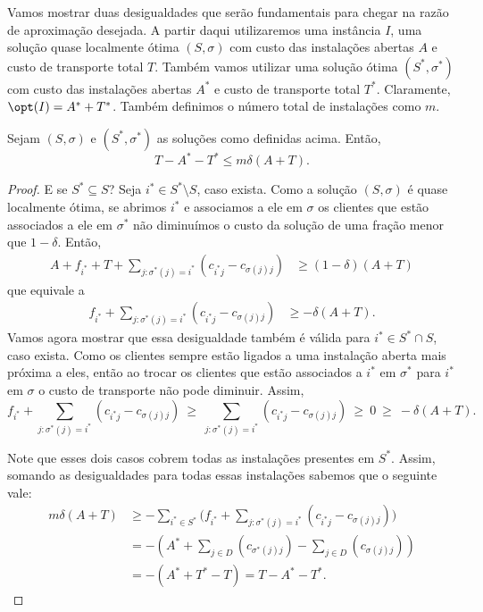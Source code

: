 Vamos mostrar duas desigualdades que serão fundamentais para chegar na razão de aproximação desejada. A partir daqui utilizaremos uma instância $I$, uma solução quase localmente ótima $(S,\sigma)$ com custo das instalações abertas $A$ e custo de transporte total $T$. Também vamos utilizar uma solução ótima $(S^*,\sigma^*)$ com custo das instalações abertas $A^*$ e custo de transporte total $T^*$. Claramente, $\opt(I) = A^* + T^*$. Também definimos o número total de instalações como $m$.
\begin{lemma}
    \label{lema:3.7}
    Sejam $(S,\sigma)$ e $(S^*,\sigma^*)$ as soluções como definidas acima. Então,
    \[ T - A^* - T^* \leq m \delta (A+T).\]
\end{lemma}
\begin{proof}
    E se $S^* \subseteq S$? 
    Seja $i^* \in S^* \setminus S$, caso exista. Como a solução $(S,\sigma)$ é quase localmente ótima, se abrimos $i^*$ e associamos a ele em $\sigma$ os clientes que estão associados a ele em $\sigma^*$ não diminuímos o custo da solução de uma fração menor que $1-\delta$. Então,
    \begin{align*} 
      A + f_{i^*} + T + \sum_{j : \sigma^*(j) = i^*} (c_{i^*j} - c_{\sigma(j)j}) &\geq (1-\delta)(A+T)
    \end{align*} 
que equivale a 
    \begin{align*} 
    f_{i^*} + \sum_{j : \sigma^*(j) = i^*} (c_{i^*j} - c_{\sigma(j)j}) &\geq -\delta(A+T).
    \end{align*} 
    Vamos agora mostrar que essa desigualdade também é válida para $i^* \in S^* \cap S$, caso exista. Como os clientes sempre estão ligados a uma instalação aberta mais próxima a eles, então ao trocar os clientes que estão associados a $i^*$ em $\sigma^*$ para $i^*$ em $\sigma$ o custo de transporte não pode diminuir. Assim, 
    \[
        f_{i^*} + \sum_{j : \sigma^*(j) = i^*} (c_{i^*j} - c_{\sigma(j)j}) 
           \ \geq \ \sum_{j : \sigma^*(j) = i^*} (c_{i^*j} - c_{\sigma(j)j})
           \ \geq \ 0 \ \geq \ -\delta(A+T).
    \]

    Note que esses dois casos cobrem todas as instalações presentes em $S^*$. Assim, somando as desigualdades para todas essas instalações sabemos que o seguinte vale:
    \begin{subequations}\begin{align*} 
        m\delta(A+T) &\geq  - \sum_{i^* \in S^*}\Big( f_{i^*} + \sum_{j : \sigma^*(j) = i^*} (c_{i^*j} - c_{\sigma(j)j})\Big) \\
        & = -(A^* + \sum_{j \in D} (c_{\sigma^*(j)j}) - \sum_{j \in D}(c_{\sigma(j)j})) \\
        & = - (A^* + T^* - T) = T - A^* - T^*.
    \end{align*}
    \end{subequations}
\end{proof}
